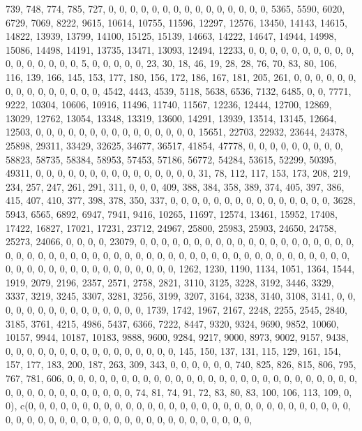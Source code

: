 \documentclass[
]{article}
\begin{document}
739, 748, 774, 785, 727, 0, 0, 0, 0, 0, 0, 0, 0, 0, 0, 0, 0, 0, 0, 0,
5365, 5590, 6020, 6729, 7069, 8222, 9615, 10614, 10755, 11596, 12297,
12576, 13450, 14143, 14615, 14822, 13939, 13799, 14100, 15125, 15139,
14663, 14222, 14647, 14944, 14998, 15086, 14498, 14191, 13735, 13471,
13093, 12494, 12233, 0, 0, 0, 0, 0, 0, 0, 0, 0, 0, 0, 0, 0, 0, 0, 0, 0,
5, 0, 0, 0, 0, 0, 23, 30, 18, 46, 19, 28, 28, 76, 70, 83, 80, 106, 116,
139, 166, 145, 153, 177, 180, 156, 172, 186, 167, 181, 205, 261, 0, 0,
0, 0, 0, 0, 0, 0, 0, 0, 0, 0, 0, 0, 0, 4542, 4443, 4539, 5118, 5638,
6536, 7132, 6485, 0, 0, 7771, 9222, 10304, 10606, 10916, 11496, 11740,
11567, 12236, 12444, 12700, 12869, 13029, 12762, 13054, 13348, 13319,
13600, 14291, 13939, 13514, 13145, 12664, 12503, 0, 0, 0, 0, 0, 0, 0, 0,
0, 0, 0, 0, 0, 0, 0, 15651, 22703, 22932, 23644, 24378, 25898, 29311,
33429, 32625, 34677, 36517, 41854, 47778, 0, 0, 0, 0, 0, 0, 0, 0, 0,
58823, 58735, 58384, 58953, 57453, 57186, 56772, 54284, 53615, 52299,
50395, 49311, 0, 0, 0, 0, 0, 0, 0, 0, 0, 0, 0, 0, 0, 0, 0, 31, 78, 112,
117, 153, 173, 208, 219, 234, 257, 247, 261, 291, 311, 0, 0, 0, 409,
388, 384, 358, 389, 374, 405, 397, 386, 415, 407, 410, 377, 398, 378,
350, 337, 0, 0, 0, 0, 0, 0, 0, 0, 0, 0, 0, 0, 0, 0, 0, 3628, 5943, 6565,
6892, 6947, 7941, 9416, 10265, 11697, 12574, 13461, 15952, 17408, 17422,
16827, 17021, 17231, 23712, 24967, 25800, 25983, 25903, 24650, 24758,
25273, 24066, 0, 0, 0, 0, 23079, 0, 0, 0, 0, 0, 0, 0, 0, 0, 0, 0, 0, 0,
0, 0, 0, 0, 0, 0, 0, 0, 0, 0, 0, 0, 0, 0, 0, 0, 0, 0, 0, 0, 0, 0, 0, 0,
0, 0, 0, 0, 0, 0, 0, 0, 0, 0, 0, 0, 0, 0, 0, 0, 0, 0, 0, 0, 0, 0, 0, 0,
0, 0, 0, 0, 0, 0, 0, 1262, 1230, 1190, 1134, 1051, 1364, 1544, 1919,
2079, 2196, 2357, 2571, 2758, 2821, 3110, 3125, 3228, 3192, 3446, 3329,
3337, 3219, 3245, 3307, 3281, 3256, 3199, 3207, 3164, 3238, 3140, 3108,
3141, 0, 0, 0, 0, 0, 0, 0, 0, 0, 0, 0, 0, 0, 0, 0, 1739, 1742, 1967,
2167, 2248, 2255, 2545, 2840, 3185, 3761, 4215, 4986, 5437, 6366, 7222,
8447, 9320, 9324, 9690, 9852, 10060, 10157, 9944, 10187, 10183, 9888,
9600, 9284, 9217, 9000, 8973, 9002, 9157, 9438, 0, 0, 0, 0, 0, 0, 0, 0,
0, 0, 0, 0, 0, 0, 0, 0, 145, 150, 137, 131, 115, 129, 161, 154, 157,
177, 183, 200, 187, 263, 309, 343, 0, 0, 0, 0, 0, 0, 740, 825, 826, 815,
806, 795, 767, 781, 606, 0, 0, 0, 0, 0, 0, 0, 0, 0, 0, 0, 0, 0, 0, 0, 0,
0, 0, 0, 0, 0, 0, 0, 0, 0, 0, 0, 0, 0, 0, 0, 0, 0, 0, 0, 0, 0, 0, 0, 74,
81, 74, 91, 72, 83, 80, 83, 100, 106, 113, 109, 0, 0), c(0, 0, 0, 0, 0,
0, 0, 0, 0, 0, 0, 0, 0, 0, 0, 0, 0, 0, 0, 0, 0, 0, 0, 0, 0, 0, 0, 0, 0,
0, 0, 0, 0, 0, 0, 0, 0, 0, 0, 0, 0, 0, 0, 0, 0, 0, 0, 0, 0, 0, 0, 0, 0,
\end{document}
